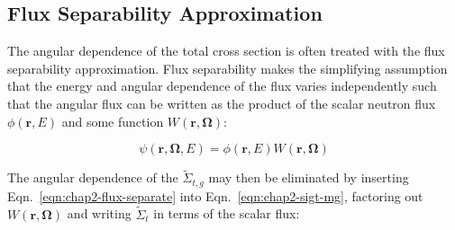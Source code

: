 




\subsection{Flux Separability Approximation}
\label{subsec:chap2-angle}

The angular dependence of the total cross section is often treated with the flux separability approximation. Flux separability makes the simplifying assumption that the energy and angular dependence of the flux varies independently such that the angular flux can be written as the product of the scalar neutron flux $\phi(\mathbf{r},E)$ and some function $W(\mathbf{r}, \mathbf{\Omega})$:

\begin{dmath}
\label{eqn:chap2-flux-separate}
\psi(\mathbf{r},\mathbf{\Omega},E) = \phi(\mathbf{r},E) W(\mathbf{r},\mathbf{\Omega})
\end{dmath}

\noindent The angular dependence of the $\tilde{\Sigma}_{t,g}$ may then be eliminated by inserting Eqn.~\ref{eqn:chap2-flux-separate} into Eqn.~\ref{eqn:chap2-sigt-mg}, factoring out $W(\mathbf{r},\mathbf{\Omega})$ and writing $\tilde{\Sigma}_{t}$ in terms of the scalar flux:

